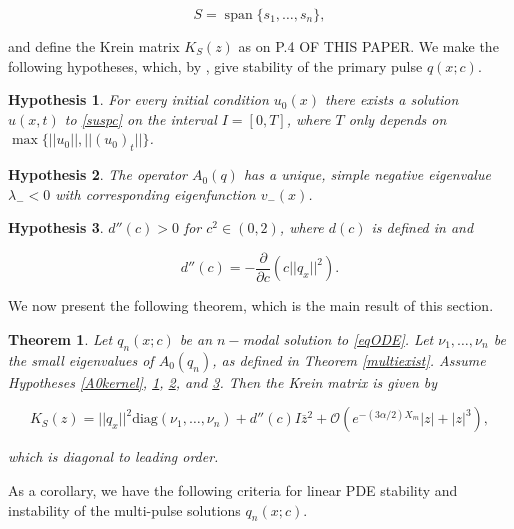 \documentclass[12pt]{article}
\DeclareMathOperator{\spn}{span}
\newtheorem{theorem}{Theorem}
\newtheorem{hypothesis}{Hypothesis}
\begin{document}
\begin{equation}\label{defS}
S = \spn\{s_1, \dots, s_n \},
\end{equation}

and define the Krein matrix $K_S(z)$ as on P.4 OF THIS PAPER. We make the following hypotheses, which, by \cite[Theorems 5.5 and 3]{Grillakis1987}, give stability of the primary pulse $q(x; c)$.

\begin{hypothesis}\label{PDEexisthyp}
For every initial condition $u_0(x)$ there exists a solution $u(x, t)$ to \eqref{suspc} on the interval $I = [0, T]$, where $T$ only depends on $\max{ \{ ||u_0||, ||(u_0)_t|| \} }$.
\end{hypothesis}

\begin{hypothesis}\label{A0neg}
The operator $A_0(q)$ has a unique, simple negative eigenvalue $\lambda_- < 0$ with corresponding eigenfunction $v_-(x)$.
\end{hypothesis}

\begin{hypothesis}\label{dccpos}
$d''(c) > 0$ for $c^2 \in (0, 2)$, where $d(c)$ is defined in \cite[Equation (2.16)]{Grillakis1987} and 

\begin{equation}\label{dcc}
d''(c) = -\frac{\partial}{\partial c} \left( c ||q_x||^2 \right).
\end{equation}
\end{hypothesis}

We now present the following theorem, which is the main result of this section.

\begin{theorem}\label{Kreindiag}
Let $q_n(x; c)$ be an $n-$modal solution to \eqref{eqODE}. Let $\nu_1, \dots, \nu_n$ be the small eigenvalues of $A_0(q_n)$, as defined in Theorem \ref{multiexist}. Assume Hypotheses \ref{A0kernel}, \ref{PDEexisthyp}, \ref{A0neg}, and \ref{dccpos}. Then the Krein matrix is given by

\begin{equation}\label{Kreinapprox}
K_S(z) = ||q_x||^2 \text{diag} (\nu_1, \dots, \nu_n)
 + d''(c) I \overline{z}^2 + \mathcal{O}(e^{-(3 \alpha/2) X_m}|z| + |z|^3),
\end{equation}

which is diagonal to leading order.

\end{theorem}

As a corollary, we have the following criteria for linear PDE stability and instability of the multi-pulse solutions $q_n(x; c)$.
\end{document}
